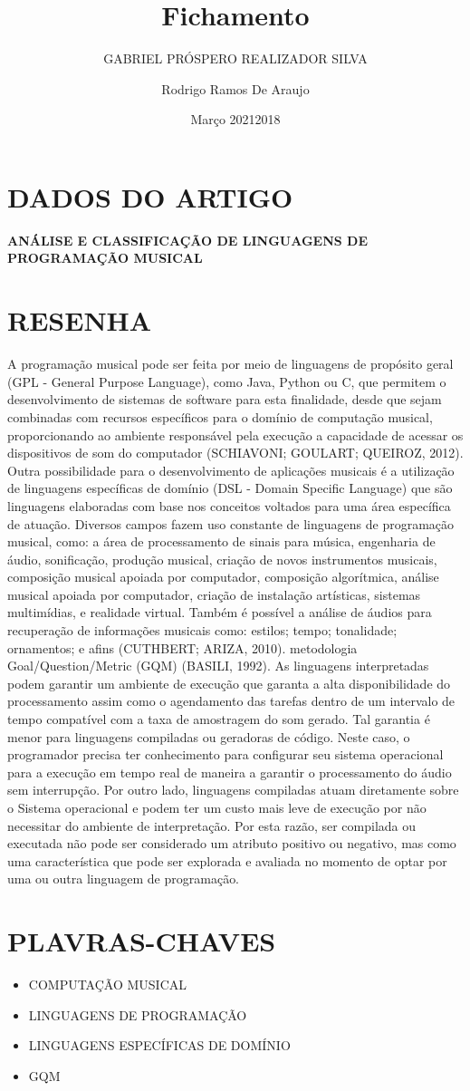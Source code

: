\documentclass{article}
\title{Fichamento}
\author{GABRIEL PRÓSPERO REALIZADOR  SILVA}
\date{Março 2021}
\begin{document}
\maketitle

\section{DADOS DO ARTIGO}
\textbf{ANÁLISE E CLASSIFICAÇÃO DE LINGUAGENS DE PROGRAMAÇÃO MUSICAL \\}
\author{Rodrigo Ramos De Araujo \\}
\date{2018}

\section{RESENHA}
 A programação musical pode ser feita por meio de linguagens de propósito geral (GPL - General Purpose Language), como Java, Python ou C, que permitem o desenvolvimento de sistemas de software para esta finalidade, desde que sejam combinadas com recursos específicos para o domínio de computação musical, proporcionando ao ambiente responsável pela execução a capacidade de acessar os dispositivos de som do computador (SCHIAVONI; GOULART; QUEIROZ, 2012). Outra possibilidade para o desenvolvimento de aplicações musicais é a utilização de linguagens específicas de domínio (DSL - Domain Specific Language) que são linguagens elaboradas com base nos conceitos voltados para uma área específica de atuação. Diversos campos fazem uso constante de linguagens de programação musical, como: a área de processamento de sinais para música, engenharia de áudio, sonificação, produção musical, criação de novos instrumentos musicais, composição musical apoiada por computador, composição algorítmica, análise musical apoiada por computador, criação de instalação artísticas, sistemas multimídias, e realidade virtual. Também é possível a análise de áudios para recuperação de informações musicais como: estilos; tempo; tonalidade; ornamentos; e afins (CUTHBERT; ARIZA, 2010). metodologia Goal/Question/Metric (GQM) (BASILI, 1992). As linguagens interpretadas podem garantir um ambiente de execução que garanta a alta disponibilidade do processamento assim como o agendamento das tarefas dentro de um intervalo de tempo compatível com a taxa de amostragem do som gerado. Tal garantia é menor para linguagens compiladas ou geradoras de código. Neste caso, o programador precisa ter conhecimento para configurar seu sistema operacional para a execução em tempo real de maneira a garantir o processamento do áudio sem interrupção. Por outro lado, linguagens compiladas atuam diretamente sobre o Sistema operacional e podem ter um custo mais leve de execução por não necessitar do ambiente de interpretação. Por esta razão, ser compilada ou executada não pode ser considerado um atributo positivo ou negativo, mas como uma característica que pode ser explorada e avaliada no momento de optar por uma ou outra linguagem de programação. 

\section{PLAVRAS-CHAVES}
\begin{itemize}
    \item COMPUTAÇÃO MUSICAL
    \item LINGUAGENS DE PROGRAMAÇÃO
    \item LINGUAGENS ESPECÍFICAS DE DOMÍNIO
    \item GQM
\end{itemize}
\end{document}
